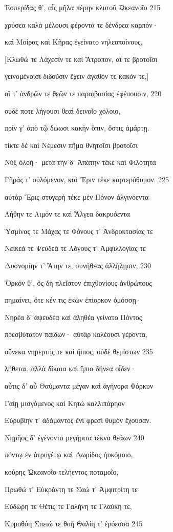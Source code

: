 Ἑσπερίδας θ', αἷς μῆλα πέρην κλυτοῦ Ὠκεανοῖο 215 

χρύσεα καλὰ μέλουσι φέροντά τε δένδρεα καρπόν·

καὶ Μοίρας καὶ Κῆρας ἐγείνατο νηλεοποίνους,

{[}Κλωθώ τε Λάχεσίν τε καὶ Ἄτροπον, αἵ τε βροτοῖσι 

γεινομένοισι διδοῦσιν ἔχειν ἀγαθόν τε κακόν τε,{]} 

αἵ τ' ἀνδρῶν τε θεῶν τε παραιβασίας ἐφέπουσιν, 220 

οὐδέ ποτε λήγουσι θεαὶ δεινοῖο χόλοιο,

πρίν γ' ἀπὸ τῷ δώωσι κακὴν ὄπιν, ὅστις ἁμάρτῃ.

τίκτε δὲ καὶ Νέμεσιν πῆμα θνητοῖσι βροτοῖσι 

Νὺξ ὀλοή· μετὰ τὴν δ' Ἀπάτην τέκε καὶ Φιλότητα 

Γῆράς τ' οὐλόμενον, καὶ Ἔριν τέκε καρτερόθυμον. 225

αὐτὰρ Ἔρις στυγερὴ τέκε μὲν Πόνον ἀλγινόεντα

Λήθην τε Λιμόν τε καὶ Ἄλγεα δακρυόεντα

Ὑσμίνας τε Μάχας τε Φόνους τ' Ἀνδροκτασίας τε

Νείκεά τε Ψεύδεά τε Λόγους τ' Ἀμφιλλογίας τε 

Δυσνομίην τ' Ἄτην τε, συνήθεας ἀλλήλῃσιν, 230

Ὅρκόν θ', ὃς δὴ πλεῖστον ἐπιχθονίους ἀνθρώπους

πημαίνει, ὅτε κέν τις ἑκὼν ἐπίορκον ὀμόσσῃ· 

Νηρέα δ' ἀψευδέα καὶ ἀληθέα γείνατο Πόντος 

πρεσβύτατον παίδων· αὐτὰρ καλέουσι γέροντα, 

οὕνεκα νημερτής τε καὶ ἤπιος, οὐδὲ θεμίστων 235

λήθεται, ἀλλὰ δίκαια καὶ ἤπια δήνεα οἶδεν· 

αὖτις δ' αὖ Θαύμαντα μέγαν καὶ ἀγήνορα Φόρκυν

Γαίῃ μισγόμενος καὶ Κητὼ καλλιπάρηον 

Εὐρυβίην τ' ἀδάμαντος ἐνὶ φρεσὶ θυμὸν ἔχουσαν.

Νηρῆος δ' ἐγένοντο μεγήριτα τέκνα θεάων 240

πόντῳ ἐν ἀτρυγέτῳ καὶ Δωρίδος ἠυκόμοιο,

κούρης Ὠκεανοῖο τελήεντος ποταμοῖο, 

Πρωθώ τ' Εὐκράντη τε Σαώ τ' Ἀμφιτρίτη τε 

Εὐδώρη τε Θέτις τε Γαλήνη τε Γλαύκη τε,

Κυμοθόη Σπειώ τε θοὴ Θαλίη τ' ἐρόεσσα 245

